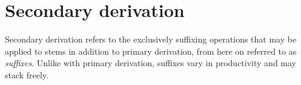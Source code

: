 \section{Secondary derivation}

Secondary derivation refers to the exclusively suffixing operations that may be applied to stems in addition to primary derivation, from here on referred to as \textit{suffixes}. Unlike with primary derivation, suffixes vary in productivity and may stack freely.


